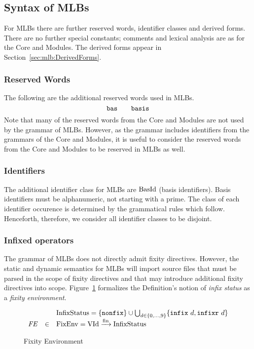 \subsection{Syntax of MLBs}

For MLBs there are further reserved words, identifier classes and
derived forms.  There are no further special constants; comments and
lexical analysis are as for the Core and Modules.  The derived forms
appear in Section~\ref{sec:mlb:DerivedForms}.
%
\subsubsection{Reserved Words}
The following are the additional reserved words used in MLBs.
\begin{displaymath}
\mathtt{bas} \quad\quad \mathtt{basis}
\end{displaymath}
Note that many of the reserved words from the Core and Modules are not
used by the grammar of MLBs.  However, as the grammar includes
identifiers from the grammars of the Core and Modules, it is useful to
consider the reserved words from the Core and Modules to be reserved
in MLBs as well.
%
\subsubsection{Identifiers}
The additional identifier class for MLBs are $\mathrm{BasId}$ (basis
identifiers).  Basis identifiers must be alphanumeric, not starting
with a prime.  The class of each identifier occurence is determined by
the grammatical rules which follow.  Henceforth, therefore, we
consider all identifier classes to be disjoint.
%
\subsubsection{Infixed operators}
The grammar of MLBs does not directly admit fixity directives.
However, the static and dynamic semantics for MLBs will import source
files that must be parsed in the scope of fixity directives and that
may introduce additional fixity directives into scope.
Figure~\ref{fig:mlb:S:FixityEnv} formalizes the Definition's notion of
\emph{infix status} as a \emph{fixity environment}.
\begin{figure}[h]
\begin{displaymath}
\begin{array}{rcl}
 & & \mathrm{InfixStatus} = \{\mathtt{nonfix}\} \cup \bigcup_{d \in \{0,\ldots,9\}} \{\mathtt{infix}~d, \mathtt{infixr}~d\} \\
\mathit{FE} & \in & \mathrm{FixEnv} = \mathrm{VId} \xrightarrow{\mathrm{fin}} \mathrm{InfixStatus} \end{array}
\end{displaymath}
\caption{Fixity Environment}\label{fig:mlb:S:FixityEnv}
\end{figure}

